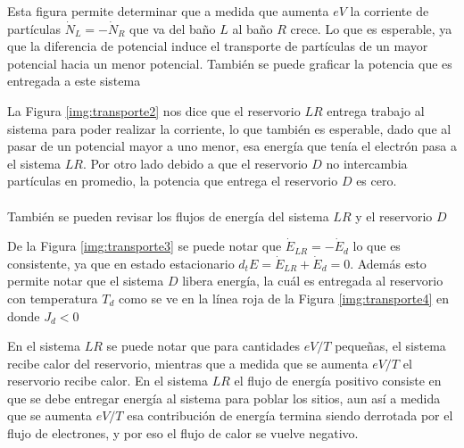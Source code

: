 
Esta figura permite determinar que a medida que aumenta $eV$ la corriente de partículas $\dot{N}_{L} = -\dot{N}_{R}$ que va del baño $L$ al baño $R$ crece. Lo que es esperable, ya que la diferencia de potencial induce el transporte de partículas de un mayor potencial hacia un menor potencial. También se puede graficar la potencia que es entregada a este sistema 

    
La Figura \ref{img:transporte2} nos dice que el reservorio $LR$ entrega trabajo al sistema para poder realizar la corriente, lo que también es esperable, dado que al pasar de un potencial mayor a uno menor, esa energía que tenía el electrón pasa a el sistema $LR$. Por otro lado debido a que el reservorio $D$ no intercambia partículas en promedio, la potencia que entrega el reservorio $D$ es cero. \\
\\
 También se pueden revisar los flujos de energía del sistema $LR$ y el reservorio $D$


    
De la Figura \ref{img:transporte3} se puede notar que $\dot{E}_{LR} = -\dot{E}_{d}$ lo que es consistente, ya que en estado estacionario $d_{t}E = \dot{E}_{LR} + \dot{E}_{d} = 0$. Además esto permite notar que el sistema $D$ libera energía, la cuál es entregada al reservorio con temperatura $T_{d}$ como se ve en la línea roja de la Figura \ref{img:transporte4} en donde $J_{d}<0$

    
En el sistema $LR$ se puede notar que para cantidades $eV/T$ pequeñas, el sistema recibe calor del reservorio, mientras que a medida que se aumenta $eV/T$ el reservorio recibe calor. En el sistema $LR$ el flujo de energía positivo consiste en que se debe entregar energía al sistema para poblar los sitios, aun así a medida que se aumenta $eV/T$ esa contribución de energía termina siendo derrotada por el flujo de electrones, y por eso el flujo de calor se vuelve negativo.\\

